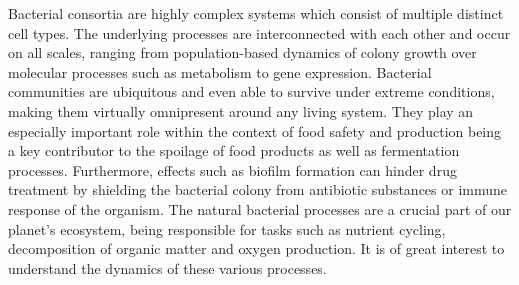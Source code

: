 \documentclass[10pt,twocolumn,5p]{elsarticle}
\numberwithin{equation}{section}
\begin{document}

Bacterial consortia are highly complex systems which consist of multiple distinct cell types.
The underlying processes are interconnected with each other and occur on all scales, ranging from
population-based dynamics of colony growth over molecular processes such as metabolism to gene
expression.
Bacterial communities are ubiquitous and even able to survive under extreme conditions, making them
virtually omnipresent around any living system.
They play an especially important role within the context of food safety and production
being a key contributor to the spoilage of food products as well as fermentation processes.
Furthermore, effects such as biofilm formation can hinder drug treatment by shielding the bacterial
colony from antibiotic substances or immune response of the organism.
The natural bacterial processes are a crucial part of our planet's ecosystem, being responsible for
tasks such as nutrient cycling, decomposition of organic matter and oxygen production.
It is of great interest to understand the dynamics of these various processes.

\end{document}
